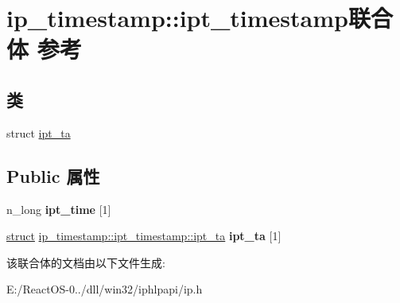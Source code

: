 \hypertarget{unionip__timestamp_1_1ipt__timestamp}{}\section{ip\+\_\+timestamp\+:\+:ipt\+\_\+timestamp联合体 参考}
\label{unionip__timestamp_1_1ipt__timestamp}
\subsection*{类}
\begin{DoxyCompactItemize}
\item 
struct \hyperlink{structip__timestamp_1_1ipt__timestamp_1_1ipt__ta}{ipt\+\_\+ta}
\end{DoxyCompactItemize}
\subsection*{Public 属性}
\begin{DoxyCompactItemize}
\item 
\mbox{\label{unionip__timestamp_1_1ipt__timestamp_a49ffe32d1958eb5fcf88cc03569effc9}} 
n\+\_\+long {\bfseries ipt\+\_\+time} \mbox{[}1\mbox{]}
\item 
\mbox{\label{unionip__timestamp_1_1ipt__timestamp_a627c2e3284ca1b541b8b0fdf0c2c5e3d}} 
\hyperlink{interfacestruct}{struct} \hyperlink{structip__timestamp_1_1ipt__timestamp_1_1ipt__ta}{ip\+\_\+timestamp\+::ipt\+\_\+timestamp\+::ipt\+\_\+ta} {\bfseries ipt\+\_\+ta} \mbox{[}1\mbox{]}
\end{DoxyCompactItemize}


该联合体的文档由以下文件生成\+:\begin{DoxyCompactItemize}
\item 
E\+:/\+React\+O\+S-\/0../dll/win32/iphlpapi/ip.\+h\end{DoxyCompactItemize}

